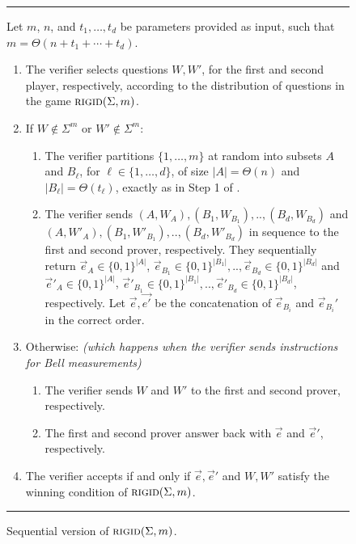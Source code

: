 \documentclass{toc}
\newcommand{\rigid}{\textsc{rigid}}
\begin{document}
\begin{figure}[H]
\rule[1ex]{\textwidth}{0.5pt}
\vspace{-25pt}
\justify 
Let $m$, $n$, and $t_1,\ldots,t_d$ be parameters provided as input, such that $m = \Theta(n+t_1+\cdots+t_d)$. 
\begin{enumerate}
\item The verifier selects questions $W,W'$, for the first and second player,
respectively, according to the distribution of questions in the game $\rigid(\Sigma,m)$.
\item If $W \not\in \Sigma^m$ or $W' \not\in \Sigma^m$: 
\begin{enumerate}
\item The verifier partitions $\{1,\ldots,m\}$ at random into subsets $A$ and $B_\ell$, for $\ell\in\{1,\ldots,d\}$, of size $|A|=\Theta(n)$ and $|B_\ell|=\Theta(t_\ell)$, exactly as in Step 1 of . 
\item The verifier sends $(A,W_A), (B_1,W_{B_1}),.., (B_d,W_{B_d})$ and $(A,W'_A), (B_1,W'_{B_1}), .., (B_d,W'_{B_d})$ in sequence to the first and second prover, %
respectively. They sequentially return %
 $\vec{e}_A \in \{0,1\}^{|A|}$, $\vec{e}_{B_1} \in \{0,1\}^{|B_1|},.., \vec{e}_{B_d} \in \{0,1\}^{|B_d|}$ and $\vec{e}'_A \in \{0,1\}^{|A|}$, $\vec{e}'_{B_1} \in \{0,1\}^{|B_1|},.., \vec{e}'_{B_d} \in \{0,1\}^{|B_d|}$,
respectively.  %
Let $\vec{e},\vec{e'}$ be the concatenation of $\vec{e}_{B_i}$ and $\vec{e}_{B_i}'$ in the correct order.
\end{enumerate}
\item Otherwise: \textit{(which happens when the verifier sends instructions for Bell measurements)} 
\begin{enumerate}
    \item The verifier sends $W$ and $W'$ to the first and second prover, respectively. 
    \item The %
first and second prover answer  %
back with $\vec{e}$ and $\vec{e}'$, respectively.
\end{enumerate}

\item The verifier accepts if and only if $\vec{e},\vec{e}'$ and $W,W'$ satisfy the winning condition of $\rigid(\Sigma,m)$.
\end{enumerate}
\rule[2ex]{\textwidth}{0.5pt}\vspace{-.5cm}
\caption{Sequential version of $\rigid(\Sigma,m)$.}
\label{fig:consistency-game}
\label{fig:rigidity-sequential}
\end{figure} 
\end{document}
